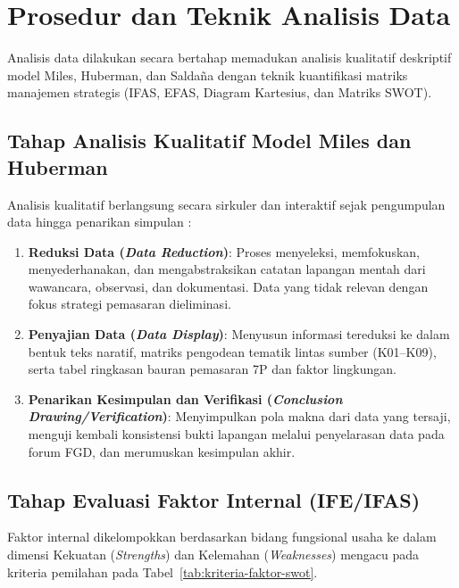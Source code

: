 \section{Prosedur dan Teknik Analisis Data}
\label{sec:bab3-teknik-analisis-data}
Analisis data dilakukan secara bertahap memadukan analisis kualitatif deskriptif model Miles, Huberman, dan Saldaña dengan teknik kuantifikasi matriks manajemen strategis (IFAS, EFAS, Diagram Kartesius, dan Matriks SWOT).

\subsection{Tahap Analisis Kualitatif Model Miles dan Huberman}
Analisis kualitatif berlangsung secara sirkuler dan interaktif sejak pengumpulan data hingga penarikan simpulan \parencite{miles2020qualitativedata}:
\begin{enumerate}
    \item \textbf{Reduksi Data (\textit{Data Reduction})}: Proses menyeleksi, memfokuskan, menyederhanakan, dan mengabstraksikan catatan lapangan mentah dari wawancara, observasi, dan dokumentasi. Data yang tidak relevan dengan fokus strategi pemasaran dieliminasi.
    \item \textbf{Penyajian Data (\textit{Data Display})}: Menyusun informasi tereduksi ke dalam bentuk teks naratif, matriks pengodean tematik lintas sumber (K01--K09), serta tabel ringkasan bauran pemasaran 7P dan faktor lingkungan.
    \item \textbf{Penarikan Kesimpulan dan Verifikasi (\textit{Conclusion Drawing/Verification})}: Menyimpulkan pola makna dari data yang tersaji, menguji kembali konsistensi bukti lapangan melalui penyelarasan data pada forum FGD, dan merumuskan kesimpulan akhir.
\end{enumerate}

\subsection{Tahap Evaluasi Faktor Internal (IFE/IFAS)}
Faktor internal dikelompokkan berdasarkan bidang fungsional usaha ke dalam dimensi Kekuatan (\textit{Strengths}) dan Kelemahan (\textit{Weaknesses}) mengacu pada kriteria pemilahan pada Tabel~\ref{tab:kriteria-faktor-swot}.

